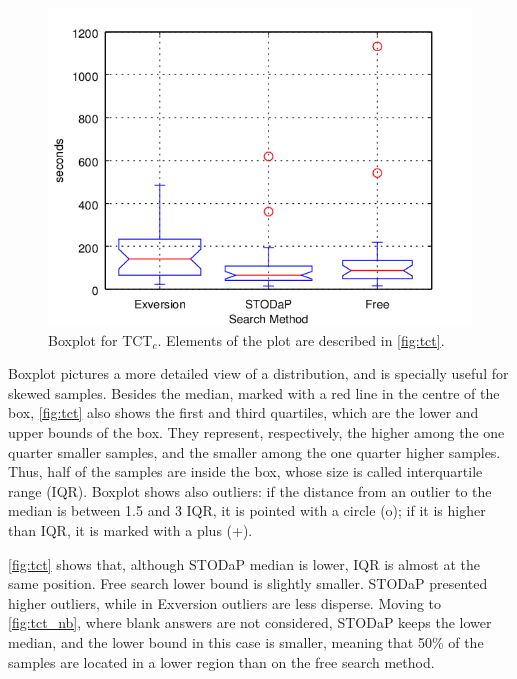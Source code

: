 \begin{figure}[h]
\begin{center}
\includegraphics[scale=1.2]{images/tct_boxplotresults_correct.png}
\caption[Boxplot for TCT$_{c}$.]{Boxplot for TCT$_{c}$. Elements of the plot are described in \autoref{fig:tct}.}
\label{fig:tct_c}
\end{center}
\end{figure}


Boxplot pictures a more detailed view of a distribution, and is specially useful for skewed samples.
Besides the median, marked with a red line in the centre of the box, \autoref{fig:tct} also shows the first and third quartiles, which are the lower and upper bounds of the box.
They represent, respectively, the higher among the one quarter smaller samples, and the smaller among the one quarter higher samples.
Thus, half of the samples are inside the box, whose size is called interquartile range (IQR).
Boxplot shows also outliers: if the distance from an outlier to the median is between 1.5 and 3 IQR, it is pointed with a circle (o); if it is higher than IQR, it is marked with a plus (+).

\autoref{fig:tct} shows that, although STODaP median is lower, IQR is almost at the same position.
Free search lower bound is slightly smaller.
STODaP presented higher outliers, while in Exversion outliers are less disperse.
Moving to \autoref{fig:tct_nb}, where blank answers are not considered, STODaP keeps the lower median, and the lower bound in this case is smaller, meaning that 50\% of the samples are located in a lower region than on the free search method.

